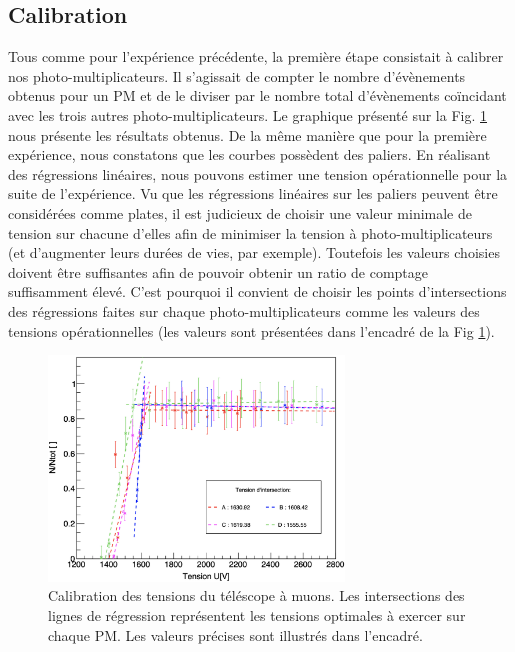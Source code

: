 \documentclass[12pt]{article}
\begin{document}
\subsection{Calibration}

Tous comme pour l'expérience précédente, la première étape consistait à calibrer nos photo-multiplicateurs. Il s'agissait de compter le nombre d'évènements obtenus pour un PM et de le diviser par le nombre total d'évènements coïncidant avec les trois autres photo-multiplicateurs.  Le graphique présenté sur la Fig. \ref{fig:Graph_calib_exp_2} nous présente les résultats obtenus. 
De la même manière que pour la première expérience, nous constatons que les courbes possèdent des paliers. En réalisant des régressions linéaires, nous pouvons estimer une tension opérationnelle pour la suite de l'expérience. Vu que les régressions linéaires sur les paliers peuvent être considérées comme plates, il est judicieux de choisir une valeur minimale de tension sur chacune d'elles afin de minimiser la tension à photo-multiplicateurs (et d'augmenter leurs durées de vies, par exemple). Toutefois les valeurs choisies doivent être suffisantes afin de pouvoir obtenir un ratio de comptage suffisamment élevé. C'est pourquoi il convient de choisir les points d'intersections des régressions faites sur chaque photo-multiplicateurs comme les valeurs des tensions opérationnelles (les valeurs sont présentées dans l'encadré de la Fig \ref{fig:Graph_calib_exp_2}).

\begin{figure}[htpb!]
    \centering
    \includegraphics[width=0.7\textwidth]{graphiques/experience2/calibration_exp_2.png}
    \captionsetup{width=0.9\textwidth}
    \caption{Calibration des tensions du téléscope à muons. Les intersections des lignes de régression représentent les tensions optimales à exercer sur chaque PM. Les valeurs précises sont illustrés dans l'encadré.}
    \label{fig:Graph_calib_exp_2}
\end{figure}
\end{document}
